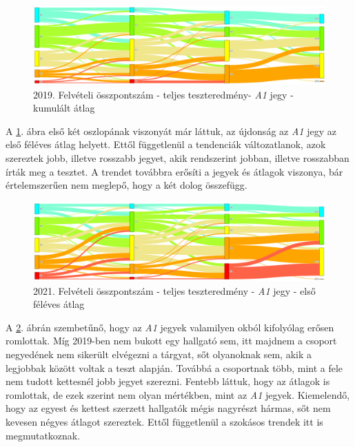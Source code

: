 \documentclass[12pt]{article}
\begin{document}
\begin{figure}[H]
\centering
\includegraphics[width = \textwidth]{kepek/2019_felvi_teszt_a1_kumatl.png}
\caption{2019. Felvételi összpontszám - teljes teszteredmény- \textit{A1} jegy - kumulált átlag}
\label{fig:2019_felvi_teszt_a1_kumatl}
\end{figure}

A \ref{fig:2019_felvi_teszt_a1_kumatl}. ábra első két oszlopának viszonyát már láttuk, az újdonság az \textit{A1} jegy az első féléves átlag helyett. Ettől függetlenül a tendenciák változatlanok, azok szereztek jobb, illetve rosszabb jegyet, akik rendszerint jobban, illetve rosszabban írták meg a tesztet. A trendet továbbra erősíti a jegyek és átlagok viszonya, bár értelemszerűen nem meglepő, hogy a két dolog összefügg.

\begin{figure}[H]
\centering
\includegraphics[width = \textwidth]{kepek/2021_felvi_teszt_a1_atlag.png}
\caption{2021. Felvételi összpontszám - teljes teszteredmény - \textit{A1} jegy - első féléves átlag}
\label{fig:2021_felvi_teszt_a1_atlag}
\end{figure}

A \ref{fig:2021_felvi_teszt_a1_atlag}. ábrán szembetűnő, hogy az \textit{A1} jegyek valamilyen okból kifolyólag erősen romlottak. Míg 2019-ben nem bukott egy hallgató sem, itt majdnem a csoport negyedének nem sikerült elvégezni a tárgyat, sőt olyanoknak sem, akik a legjobbak között voltak a teszt alapján. Továbbá a csoportnak több, mint a fele nem tudott kettesnél jobb jegyet szerezni. Fentebb láttuk, hogy az átlagok is romlottak, de ezek szerint nem olyan mértékben, mint az \textit{A1} jegyek. Kiemelendő, hogy az egyest és kettest szerzett hallgatók mégis nagyrészt hármas, sőt nem kevesen négyes átlagot szereztek. Ettől függetlenül a szokásos trendek itt is megmutatkoznak.
 
\end{document}
